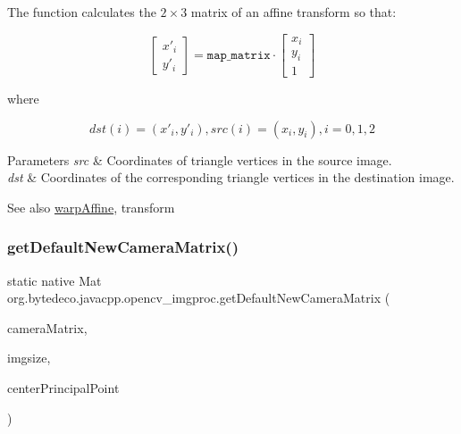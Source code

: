 The function calculates the $2 \times 3$ matrix of an affine transform so that\+: 

\[\begin{bmatrix} x'_i \\ y'_i \end{bmatrix} = \texttt{map_matrix} \cdot \begin{bmatrix} x_i \\ y_i \\ 1 \end{bmatrix}\] 

where 

\[dst(i)=(x'_i,y'_i), src(i)=(x_i, y_i), i=0,1,2\] 


\begin{DoxyParams}{Parameters}
{\em src} & Coordinates of triangle vertices in the source image. \\
\hline
{\em dst} & Coordinates of the corresponding triangle vertices in the destination image. \\
\hline
\end{DoxyParams}
\begin{DoxySeeAlso}{See also}
\hyperlink{group__imgproc__transform_ga0f7c28988998c3ae473a6708bdeef114}{warp\+Affine}, transform 
\end{DoxySeeAlso}
\mbox{\label{group__imgproc__transform_gadf9fb3deefd512a073b449832fe60679}} 
\subsubsection{\texorpdfstring{get\+Default\+New\+Camera\+Matrix()}{getDefaultNewCameraMatrix()}}
{\footnotesize\ttfamily static native Mat org.\+bytedeco.\+javacpp.\+opencv\+\_\+imgproc.\+get\+Default\+New\+Camera\+Matrix (\begin{DoxyParamCaption}\item[{@By\+Val Mat}]{camera\+Matrix,  }\item[{@By\+Val(null\+Value=\char`\"{}cv\+::\+Size()\char`\"{}) Size}]{imgsize,  }\item[{@Cast(\char`\"{}bool\char`\"{}) boolean}]{center\+Principal\+Point }\end{DoxyParamCaption})\hspace{0.3cm}{\ttfamily [static]}}



